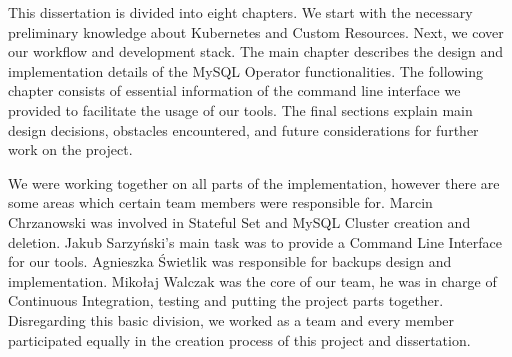This dissertation is divided into eight chapters. We start with the necessary 
preliminary knowledge about Kubernetes and Custom Resources. Next, we cover 
our workflow and development stack. The main chapter describes the design and 
implementation details of the MySQL Operator functionalities. The following 
chapter consists of essential information of the command line interface we 
provided to facilitate the usage of our tools. The final sections explain main 
design decisions, obstacles encountered, and future considerations for further 
work on the project.

We were working together on all parts of the implementation, however there are 
some areas which certain team members were responsible for. Marcin Chrzanowski 
was involved in Stateful Set and MySQL Cluster creation and deletion. Jakub 
Sarzyński’s main task was to provide a Command Line Interface for our tools. 
Agnieszka Świetlik was responsible for backups design and implementation. Mikołaj 
Walczak was the core of our team, he was in charge of Continuous Integration, 
testing and putting the project parts together. Disregarding this basic division, 
we worked as a team and every member participated equally in the creation process 
of this project and dissertation.
